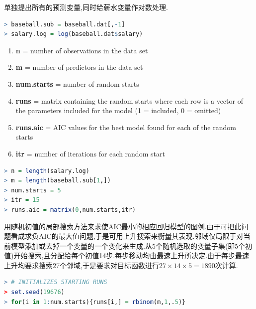 \documentclass[11pt,a4paper,oneside]{book}
\begin{document}
单独提出所有的预测变量,同时给薪水变量作对数处理.
\begin{lstlisting}[language=r]
> baseball.sub = baseball.dat[,-1]
> salary.log = log(baseball.dat$salary)
\end{lstlisting}
\begin{enumerate}
	\item \textbf{n} = number of observations in the data set
	\item \textbf{m} = number of predictors in the data set
	\item \textbf{num.starts} = number of random starts
	\item \textbf{runs} = matrix containing the random starts where each row is a vector of the parameters included for the model (1 = included, 0 = omitted)
	\item \textbf{runs.aic}	= AIC values for the best model found for each of the random starts
	\item \textbf{itr} = number of iterations for each random start
\end{enumerate}

\begin{lstlisting}[language=r]
> n = length(salary.log)
> m = length(baseball.sub[1,])
> num.starts = 5
> itr = 15
> runs.aic = matrix(0,num.starts,itr)
\end{lstlisting}

用随机初值的局部搜索方法来求使AIC最小的相应回归模型的图例.由于可把此问题看成求负AIC的最大值问题,于是可用上升搜索来衡量其表现.邻域仅局限于对当前模型添加或去掉一个变量的一个变化来生成.从5个随机选取的变量子集(即5个初值)开始搜索,且分配给每个初值14步.每步移动均由最速上升所决定.由于每步最速上升均要求搜索27个邻域,于是要求对目标函数进行$ 27\times 14\times 5=1890 $次计算.


\begin{lstlisting}[language=r]
> # INITIALIZES STARTING RUNS
> set.seed(19676) 
> for(i in 1:num.starts){runs[i,] = rbinom(m,1,.5)}
\end{lstlisting}
\end{document}

